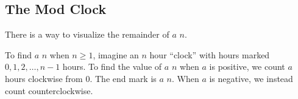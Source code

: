 
\newcommand{\submod}{The Mod Clock}
\subsection{\submod}
\label{sub_mod_clock}

There is a way to visualize the remainder of $a$  $n$. 

\begin{rem}
To find $a$  $n$ when $n \ge 1$, imagine an $n$ hour ``clock'' with hours marked $0, 1, 2, \ldots, n-1$ hours.  To find the value of $a$  $n$ when $a$ is positive, we count $a$ hours clockwise from $0$.  The end mark is $a$  $n$.  When $a$ is negative, we instead count counterclockwise.   
\end{rem}

